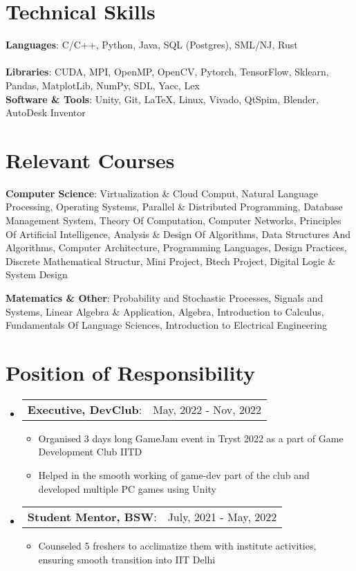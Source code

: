\documentclass[letterpaper,11pt]{article}
\makeatletter
\newcommand{\resumeItem}[1]{
  \item\small{
    {#1 \vspace{-2pt}}
  }
}
\newcommand{\headingStart}{
  \begin{tabular*}{0.97\textwidth}[t]{l@{\extracolsep{\fill}}r}
}
\newcommand{\porHeading}[3]{
  \vspace{-2pt}\item
    \headingStart
      \textbf{#1, #2}: & #3 \\
    \end{tabular*}\vspace{-7pt}
}
\newcommand{\listStart}[2]
  {\begin{itemize}[leftmargin=#1in, rightmargin=0in, label={#2}]}
\newcommand{\listEnd}{\end{itemize}}
\newcommand{\itemListStart}[1]
  {\begin{itemize}[leftmargin=#1in, rightmargin=0in]}
\newcommand{\itemListEnd}{\end{itemize}\vspace{-5pt}}
\makeatother
\begin{document}
%
\section{Technical Skills}
  \listStart{0.05}{}
    \small{\item{
     \textbf{Languages}{: C/C++, Python, Java, SQL (Postgres), SML/NJ, Rust} \\
     \hspace{1.5em}{Familiar: MIPS(Assembly), VHDL, HTML, CSS, JavaScript, C\#, Prolog, Bash} \\
     \textbf{Libraries}{: CUDA, MPI, OpenMP, OpenCV, Pytorch, TensorFlow, Sklearn, Pandas, MatplotLib, NumPy, SDL, Yacc, Lex}\\
     \textbf{Software \& Tools}{:  Unity, Git, LaTeX, Linux, Vivado, QtSpim, Blender, AutoDesk Inventor}\\
     }}
  \listEnd


%
\section{Relevant Courses}
  \itemListStart{0.2}
  \small{\item{
  \textbf{Computer Science}{: Virtualization \& Cloud Comput, Natural Language Processing, Operating Systems, 
    Parallel \& Distributed Programming, Database Management System, Theory Of Computation, Computer Networks, Principles Of Artificial Intelligence,
    Analysis \& Design Of Algorithms, Data Structures And Algorithms, Computer Architecture, Programming Languages, Design Practices, Discrete Mathematical Structur, 
    Mini Project, Btech Project, Digital Logic \& System Design}
  }}
  \small{\item{
    \textbf{Matematics \& Other}{: Probability and Stochastic Processes, Signals and Systems,
    Linear Algebra \& Application, Algebra, Introduction to Calculus, Fundamentals Of Language Sciences, Introduction to Electrical Engineering }
  }}
  \listEnd


% 

\section{Position of Responsibility}
\listStart{0.05}{}

\porHeading
  {Executive}
  {DevClub}
  {May, 2022 - Nov, 2022}
  \itemListStart{0.2}
    \resumeItem{Organised 3 days long GameJam event in Tryst 2022 as a part of Game Development Club IITD}
    \resumeItem{Helped in the smooth working of game-dev part of the club and developed multiple PC games using Unity    }
  \itemListEnd

\porHeading
  {Student Mentor}
  {BSW}
  {July, 2021 - May, 2022}
  \itemListStart{0.2}
    \resumeItem{Counseled 5 freshers to acclimatize them with institute activities, ensuring smooth transition into IIT Delhi}
  \itemListEnd
\listEnd


\end{document}
